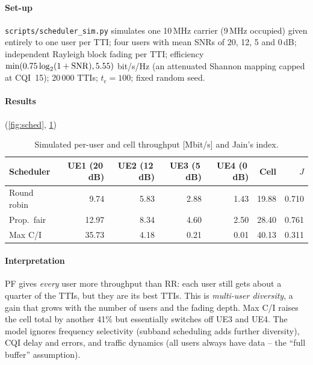 \documentclass[11pt,a4paper]{article}
\begin{document}
\paragraph{Set-up} \texttt{scripts/scheduler\_sim.py} simulates one 10\,MHz carrier (9\,MHz occupied)
given entirely to one user per TTI; four users with mean SNRs of 20, 12, 5 and 0\,dB; independent
Rayleigh block fading per TTI; efficiency $\min(0.75\log_2(1+\mathrm{SNR}),5.55)$ bit/s/Hz (an attenuated
Shannon mapping capped at CQI~15); 20\,000 TTIs; $t_\mathrm{c} = 100$; fixed random seed.
\paragraph{Results} (\cref{fig:sched}, \cref{tab:sim})
\begin{table}[htbp]
\centering\small
\caption{Simulated per-user and cell throughput [Mbit/s] and Jain's index.}\label{tab:sim}
\begin{tabular}{@{}lrrrrrr@{}}
\toprule
Scheduler & UE1 (20\,dB) & UE2 (12\,dB) & UE3 (5\,dB) & UE4 (0\,dB) & Cell & $J$ \\
\midrule
Round robin  & 9.74  & 5.83 & 2.88 & 1.43 & 19.88 & 0.710 \\
Prop.\ fair  & 12.97 & 8.34 & 4.60 & 2.50 & 28.40 & 0.761 \\
Max C/I      & 35.73 & 4.18 & 0.21 & 0.01 & 40.13 & 0.311 \\
\bottomrule
\end{tabular}
\end{table}
\paragraph{Interpretation} PF gives \emph{every} user more throughput than RR: each user still gets
about a quarter of the TTIs, but they are its best TTIs. This is \emph{multi-user diversity}, a gain
that grows with the number of users and the fading depth. Max C/I raises the cell total by another 41\%
but essentially switches off UE3 and UE4. The model ignores frequency selectivity (subband
scheduling adds further diversity), CQI delay and errors, and traffic dynamics (all users always have
data -- the ``full buffer'' assumption).

\begin{acnfigure}
  \caption{Per-user throughput under round robin, proportional fair and maximum C/I scheduling
  (simulation of \cref{sec:sim}).}
  \label{fig:sched}
\end{acnfigure}
\end{document}
